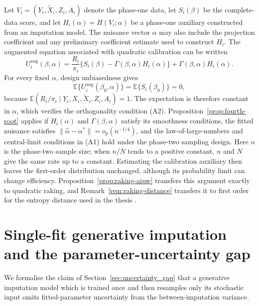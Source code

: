 \begin{remark}\label{rem:mapping}
Let $V_i=(Y_i,\tilde X_i,Z_i,A_i)$ denote the phase-one data, let $S_i(\beta)$ be the complete-data score, and let $H_i(\alpha)=H(V_i;\alpha)$ be a phase-one auxiliary constructed from an imputation model. The nuisance vector $\alpha$ may also include the projection coefficient and any preliminary coefficient estimate used to construct $H_i$. The augmented equation associated with quadratic calibration can be written
\[
U_i^{\mathrm{aug}}(\beta,\alpha)
=\frac{R_i}{\pi_i}\{S_i(\beta)-\Gamma(\beta,\alpha)H_i(\alpha)\}
+\Gamma(\beta,\alpha)H_i(\alpha).
\]
For every fixed $\alpha$, design unbiasedness gives
\[
\mathbb E\{U_i^{\mathrm{aug}}(\beta_0,\alpha)\}
=\mathbb E\{S_i(\beta_0)\}=0,
\]
because $\mathbb E(R_i/\pi_i\mid Y_i,X_i,\tilde X_i,Z_i,A_i)=1$. The expectation is therefore constant in $\alpha$, which verifies the orthogonality condition (A2). Proposition~\ref{prop:fourth-root} applies if $H_i(\alpha)$ and $\Gamma(\beta,\alpha)$ satisfy its smoothness conditions, the fitted nuisance satisfies $\lVert\hat\alpha-\alpha^*\rVert=o_p(n^{-1/4})$, and the law-of-large-numbers and central-limit conditions in (A1) hold under the phase-two sampling design. Here $n$ is the phase-two sample size; when $n/N$ tends to a positive constant, $n$ and $N$ give the same rate up to a constant. Estimating the calibration auxiliary then leaves the first-order distribution unchanged, although its probability limit can change efficiency. Proposition~\ref{prop:raking-aipw} transfers this argument exactly to quadratic raking, and Remark~\ref{rem:raking-distance} transfers it to first order for the entropy distance used in the thesis \citep{lumley2023fourthroot}.
\end{remark}

\section{Single-fit generative imputation and the parameter-uncertainty gap}\label{app:improper-mi}

We formalise the claim of Section~\ref{sec:uncertainty_gap} that a generative imputation model which is trained once and then resamples only its stochastic input omits fitted-parameter uncertainty from the between-imputation variance.

